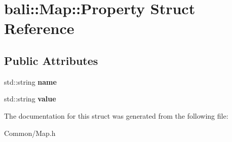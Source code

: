 \hypertarget{structbali_1_1_map_1_1_property}{\section{bali\-:\-:Map\-:\-:Property Struct Reference}
\label{structbali_1_1_map_1_1_property}
}
\subsection*{Public Attributes}
\begin{DoxyCompactItemize}
\item 
\hypertarget{structbali_1_1_map_1_1_property_a21fbf0c9a3eaf95d7308d5ac996c4785}{std\-::string {\bfseries name}}\label{structbali_1_1_map_1_1_property_a21fbf0c9a3eaf95d7308d5ac996c4785}

\item 
\hypertarget{structbali_1_1_map_1_1_property_aa2812da7e090748d426c9469dfb24982}{std\-::string {\bfseries value}}\label{structbali_1_1_map_1_1_property_aa2812da7e090748d426c9469dfb24982}

\end{DoxyCompactItemize}


The documentation for this struct was generated from the following file\-:\begin{DoxyCompactItemize}
\item 
Common/Map.\-h\end{DoxyCompactItemize}
